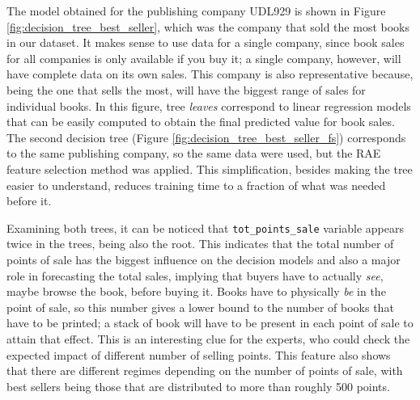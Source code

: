 \documentclass[a4paper,10pt,twocolumn,preprint,3p]{elsarticle}
\begin{document}
The model obtained for the publishing company UDL929 is shown in
Figure \ref{fig:decision_tree_best_seller}, which was the company that
sold the most books in our dataset. It makes sense to use data for a
single company, since book sales for all companies is only available
if you buy it; a single company, however, will have complete data on
its own sales. This company is also representative because, being the
one that sells the most, will have the biggest range of sales for
individual books. In this figure, tree {\em leaves} correspond to
linear regression models that can be easily computed to obtain the
final predicted value for book sales.
The second decision tree (Figure
\ref{fig:decision_tree_best_seller_fs}) corresponds to the same
publishing company, so the same data were used, but the RAE %
feature
selection method was applied. This simplification, besides making the
tree easier to understand, reduces training time to a fraction of what
was needed before it. 

Examining both trees, it can be noticed that
\texttt{tot\_points\_sale} variable appears twice in the trees, being
also the root. This indicates that the total number of points of sale
has the biggest influence on the decision models and also a major role in
forecasting the total sales, implying that buyers have to actually
{\em see}, maybe browse the book, before buying it. Books have to
physically {\em be} in the point of sale, so this number gives a lower
bound to the number of books that have to be printed; a stack of book
will have to be present in each point of sale to attain that effect. 
 This is an interesting clue for the
experts, who could check the expected impact of different number of
selling points. This feature also shows that there are different
regimes depending on the number of points of sale, with best sellers
being those that are distributed to more than roughly 500 points. 
\end{document}
